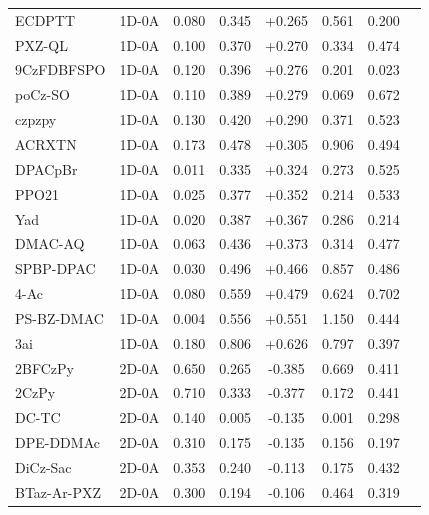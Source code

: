 \begin{longtable}{llcccccc}
ECDPTT & 1D-0A & 0.080 & 0.345 & +0.265 & 0.561 & 0.200 & \cite{doi101016jtet201712022} \\
PXZ-QL & 1D-0A & 0.100 & 0.370 & +0.270 & 0.334 & 0.474 & \cite{doi101039D0QM00628A} \\
9CzFDBFSPO & 1D-0A & 0.120 & 0.396 & +0.276 & 0.201 & 0.023 & \cite{doi101016jcej2019122485} \\
poCz-SO & 1D-0A & 0.110 & 0.389 & +0.279 & 0.069 & 0.672 & \cite{doi101039C8TC06293E} \\
czpzpy & 1D-0A & 0.130 & 0.420 & +0.290 & 0.371 & 0.523 & \cite{doi101039C4TC02255F} \\
ACRXTN & 1D-0A & 0.173 & 0.478 & +0.305 & 0.906 & 0.494 & \cite{doi101039D1NJ05251A} \\
DPACpBr & 1D-0A & 0.011 & 0.335 & +0.324 & 0.273 & 0.525 & \cite{doi101016jdyepig2021109224} \\
PPO21 & 1D-0A & 0.025 & 0.377 & +0.352 & 0.214 & 0.533 & \cite{doi101016jcej2021133546} \\
Yad & 1D-0A & 0.020 & 0.387 & +0.367 & 0.286 & 0.214 & \cite{doi101016jcclet202007041} \\
DMAC-AQ & 1D-0A & 0.063 & 0.436 & +0.373 & 0.314 & 0.477 & \cite{doi101016jorgel2022106657} \\
SPBP-DPAC & 1D-0A & 0.030 & 0.496 & +0.466 & 0.857 & 0.486 & \cite{doi101039D0SC05631F} \\
4-Ac & 1D-0A & 0.080 & 0.559 & +0.479 & 0.624 & 0.702 & \cite{doi101016jorgel2019105576} \\
PS-BZ-DMAC & 1D-0A & 0.004 & 0.556 & +0.551 & 1.150 & 0.444 & \cite{doi101016jdyepig2021109649} \\
3ai & 1D-0A & 0.180 & 0.806 & +0.626 & 0.797 & 0.397 & \cite{doi101039C5RA13651B} \\
2BFCzPy & 2D-0A & 0.650 & 0.265 & -0.385 & 0.669 & 0.411 & \cite{doi101016jorgel201710015} \\
2CzPy & 2D-0A & 0.710 & 0.333 & -0.377 & 0.172 & 0.441 & \cite{doi101016jorgel201710015} \\
DC-TC & 2D-0A & 0.140 & 0.005 & -0.135 & 0.001 & 0.298 & \cite{doi101039C7TC01164D} \\
DPE-DDMAc & 2D-0A & 0.310 & 0.175 & -0.135 & 0.156 & 0.197 & \cite{doi101039C7TC02763J} \\
DiCz-Sac & 2D-0A & 0.353 & 0.240 & -0.113 & 0.175 & 0.432 & \cite{doi101016jcej2021129628} \\
BTaz-Ar-PXZ & 2D-0A & 0.300 & 0.194 & -0.106 & 0.464 & 0.319 & \cite{doi101039D1TC04885F} \\

\end{longtable}
